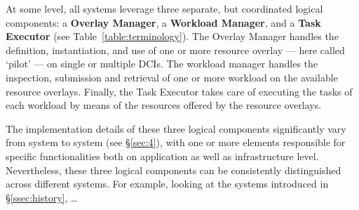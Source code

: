 \documentclass{sig-alternate}
\begin{document}
At some level, all \pilotjob systems leverage three separate, but
coordinated logical components: a \textbf{Overlay Manager}, a
\textbf{Workload Manager}, and a \textbf{Task Executor}
(see Table~\ref{table:terminology}). The Overlay Manager handles the
definition, instantiation, and use of one or more resource overlay ---
here called `pilot' --- on single or multiple DCIs. The workload manager
handles the inspection, submission and retrieval of one or more workload
on the available resource overlays. Finally, the Task Executor takes
care of executing the tasks of each workload by means of the resources
offered by the resource overlays.

The implementation details of these three logical components
significantly vary from \pilotjob system to \pilotjob system (see
\S\ref{sec:4}), with one or more elements responsible for specific
functionalities both on application as well as infrastructure level.
Nevertheless, these three logical components can be consistently
distinguished across different \pilotjob systems. For example, looking
at the systems introduced in \S\ref{ssec:history}, \ldots
{}

\end{document}
